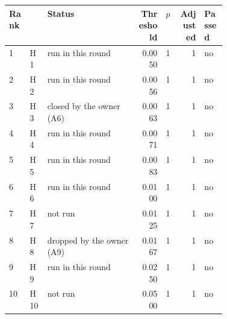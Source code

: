 {\scriptsize\setlength{\tabcolsep}{2pt}
\begin{tabular}{@{}llp{0.42\linewidth}rrrl@{}}
\toprule
Rank &  & Status & Threshold & $p$ & Adjusted & Passed \\
\midrule
1 & H1 & run in this round & 0.0050 & 1 & 1 & no \\
2 & H2 & run in this round & 0.0056 & 1 & 1 & no \\
3 & H3 & closed by the owner (A6) & 0.0063 & 1 & 1 & no \\
4 & H4 & run in this round & 0.0071 & 1 & 1 & no \\
5 & H5 & run in this round & 0.0083 & 1 & 1 & no \\
6 & H6 & run in this round & 0.0100 & 1 & 1 & no \\
7 & H7 & not run & 0.0125 & 1 & 1 & no \\
8 & H8 & dropped by the owner (A9) & 0.0167 & 1 & 1 & no \\
9 & H9 & run in this round & 0.0250 & 1 & 1 & no \\
10 & H10 & not run & 0.0500 & 1 & 1 & no \\
\bottomrule
\end{tabular}}
